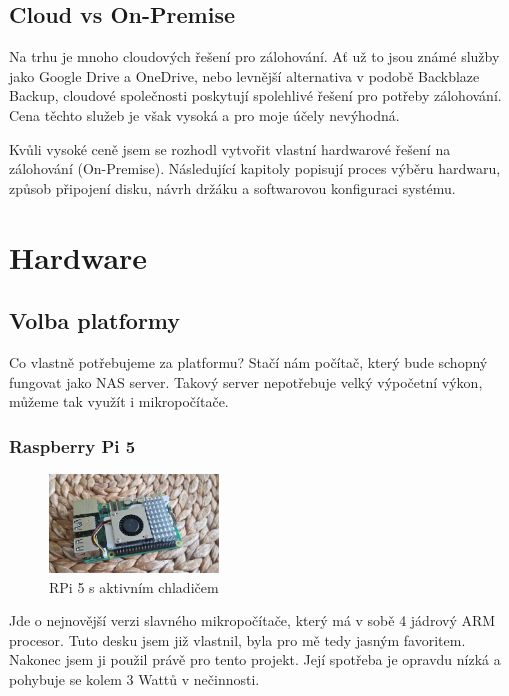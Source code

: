 \documentclass[a4paper,12pt, oneside]{book}
\begin{document}
\section{Cloud vs On-Premise}

Na trhu je mnoho cloudových řešení pro zálohování. 
Ať už to jsou známé služby jako Google Drive a OneDrive, nebo 
levnější alternativa v podobě Backblaze Backup, cloudové společnosti poskytují 
spolehlivé řešení pro potřeby zálohování. Cena těchto služeb je však vysoká a pro moje účely nevýhodná. 

Kvůli vysoké ceně jsem se rozhodl vytvořit vlastní hardwarové řešení na
zálohování (On-Premise).
Následující kapitoly popisují
proces výběru hardwaru, způsob připojení disku, návrh držáku a softwarovou
konfiguraci systému. 


\chapter{Hardware}
\section{Volba platformy}

Co vlastně potřebujeme za platformu? Stačí nám počítač, který bude 
schopný fungovat jako NAS server. Takový server nepotřebuje velký
výpočetní výkon, můžeme tak využít i mikropočítače. 


\subsection{Raspberry Pi 5}

\begin{figure}
	\centering
	\includegraphics[width=0.4\textwidth]{img/rpi5-active-cooler-c.jpg}
	\caption{RPi 5 s aktivním chladičem}
\end{figure}
Jde o nejnovější verzi slavného mikropočítače, který má v sobě 4 jádrový ARM
procesor. Tuto desku jsem již vlastnil, byla pro mě tedy jasným favoritem.
Nakonec jsem ji použil právě pro tento projekt. Její spotřeba je opravdu nízká
a pohybuje se kolem 3 Wattů v nečinnosti.  \cite{RPi-Power}
\end{document}
